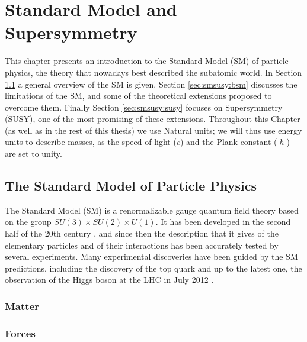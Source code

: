 \chapter{Standard Model and Supersymmetry}
\label{chap:SMSUSY}

This chapter presents an introduction to the Standard Model (SM) of particle physics, the theory that nowadays best described the subatomic world. In Section \ref{sec:smsusy:sm} a general overview of the SM is given. Section \ref{sec:smsusy:bsm} discusses the limitations of the SM, and some of the theoretical extensions proposed to overcome them. Finally Section \ref{sec:smsusy:susy} focuses on Supersymmetry (SUSY), one of the most promising of these extensions. Throughout this Chapter (as well as in the rest of this thesis) we use Natural units; we will thus use energy units to describe masses, as the speed of light ($c$) and the Plank constant ($\hslash$) are set to unity.


\section{The Standard Model of Particle Physics}
\label{sec:smsusy:sm}

The Standard Model (SM) is a renormalizable gauge quantum field theory based on the group $SU(3) \times SU(2) \times U(1)$. It has been developed in the second half of the 20th century \cite{Glashow:1961tr}\cite{Weinberg:1967tq}\cite{Salam:1980jd}, and since then the description that it gives of the elementary particles and of their interactions has been accurately tested by several experiments. Many experimental discoveries have been guided by the SM predictions, including the discovery of the top quark \cite{Abachi:1994td}\cite{PhysRevLett.74.2626} and up to the latest one, the observation of the Higgs boson at the LHC in July 2012 \cite{Aad:2012tfa}\cite{Chatrchyan:2012xdj}. 

\subsection{Matter}

\subsection{Forces}

